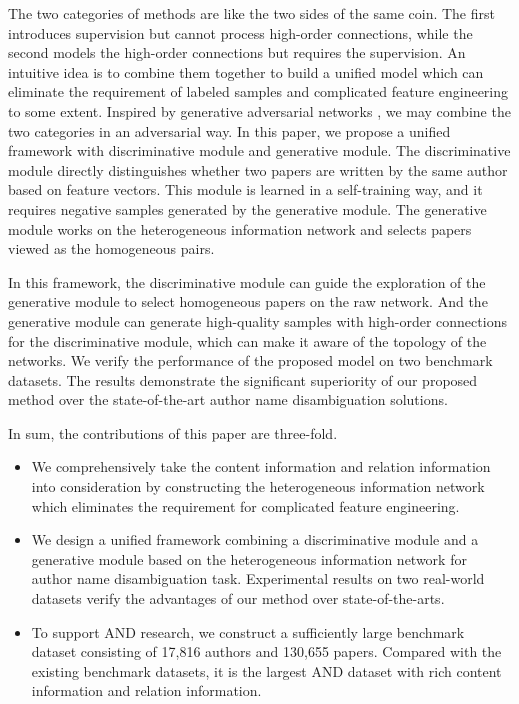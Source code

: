 \documentclass[letterpaper]{article} %
\begin{document}
The two categories of methods are like the two sides of the same coin.
The first introduces supervision but cannot process high-order connections, while the second models the high-order connections but requires the supervision.
An intuitive idea is to combine them together to build a unified model which can eliminate the requirement of labeled samples and complicated feature engineering to some extent.
Inspired by generative adversarial networks \cite{GAN}, we may combine the two categories in an adversarial way.
In this paper, we propose a unified framework with discriminative module and generative module.
The discriminative module directly distinguishes whether two papers are written by the same author based on feature vectors.
This module is learned in a self-training way, and it requires negative samples generated by the generative module.
The generative module works on the heterogeneous information network and selects papers viewed as the homogeneous pairs.

In this framework, the discriminative module can guide the exploration of the generative module to select homogeneous papers on the raw network.
And the generative module can generate high-quality samples with high-order connections for the discriminative module, which can make it aware of the topology of the networks.
We verify the performance of the proposed model on two benchmark datasets. The results demonstrate the significant superiority of our proposed method over the state-of-the-art author name disambiguation solutions.

In sum, the contributions of this paper are three-fold.
\begin{itemize}
\item We comprehensively take the content information and relation information into consideration by constructing the heterogeneous information network which eliminates the requirement for complicated feature engineering.
\item We design a unified framework combining a discriminative module and a generative module based on the heterogeneous information network for author name disambiguation task.
Experimental results on two real-world datasets verify the advantages of our method over state-of-the-arts.
\item To support AND research, we construct a sufficiently large benchmark dataset consisting of 17,816 authors and 130,655 papers. Compared with the existing benchmark datasets, it is the largest AND dataset with rich content information and relation information.
\end{itemize}
\end{document}
